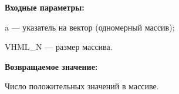 \textbf{Входные параметры:}

 a --- указатель на вектор (одномерный массив);
 
 VHML\_N --- размер массива.

\textbf{Возвращаемое значение:}

Число положительных значений в массиве.